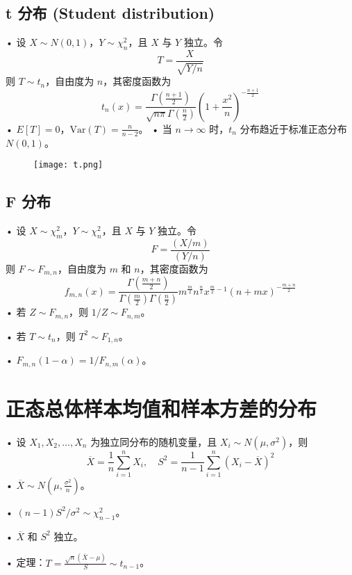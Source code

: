 \documentclass[UTF8]{report}
\theoremstyle{MyLineTheoremStyle} %
\theoremstyle{MyBlockTheoremStyle} %
\theoremstyle{MySubsubsectionStyle} %
\begin{document}
\subsection{t 分布 (Student distribution)}
• 设 $X \sim N(0,1)$，$Y \sim \chi^2_n$，且 $X$ 与 $Y$ 独立。令
\[
T = \frac{X}{\sqrt{Y/n}}
\]
则 $T \sim t_n$，自由度为 $n$，其密度函数为
\[
t_n(x) = \frac{\Gamma\left(\frac{n+1}{2}\right)}{\sqrt{n\pi} \Gamma\left(\frac{n}{2}\right)} \left(1 + \frac{x^2}{n}\right)^{-\frac{n+1}{2}}
\]
• $E[T] = 0$，$\text{Var}(T) = \frac{n}{n-2}$。
• 当 $n \to \infty$ 时，$t_n$ 分布趋近于标准正态分布 $N(0,1)$。
\begin{figure}[H]
\centering
\texttt{[image: t.png]}
\end{figure}


\subsection{F 分布}
• 设 $X \sim \chi^2_m$，$Y \sim \chi^2_n$，且 $X$ 与 $Y$ 独立。令
\[
F = \frac{(X/m)}{(Y/n)}
\]
则 $F \sim F_{m,n}$，自由度为 $m$ 和 $n$，其密度函数为
\[
f_{m,n}(x) = \frac{\Gamma\left(\frac{m+n}{2}\right)}{\Gamma\left(\frac{m}{2}\right) \Gamma\left(\frac{n}{2}\right)} m^{\frac{m}{2}} n^{\frac{n}{2}} x^{\frac{m}{2}-1} \left(n + mx\right)^{-\frac{m+n}{2}}
\]
• 若 $Z \sim F_{m,n}$，则 $1/Z \sim F_{n,m}$。\par
• 若 $T \sim t_n$，则 $T^2 \sim F_{1,n}$。\par
• $F_{m,n}(1-\alpha) = 1/F_{n,m}(\alpha)$。

\section{正态总体样本均值和样本方差的分布}
• 设 $X_1, X_2, \ldots, X_n$ 为独立同分布的随机变量，且 $X_i \sim N(\mu, \sigma^2)$，则
\[
\overline{X} = \frac{1}{n} \sum_{i=1}^{n} X_i, \quad S^2 = \frac{1}{n-1} \sum_{i=1}^{n} (X_i - \overline{X})^2
\]
• $\overline{X} \sim N\left(\mu, \frac{\sigma^2}{n}\right)$。\par
• $(n-1)S^2/\sigma^2 \sim \chi^2_{n-1}$。\par
• $\overline{X}$ 和 $S^2$ 独立。\par
• 定理：$T = \frac{\sqrt{n} (\overline{X} - \mu)}{S} \sim t_{n-1}$。
\end{document}
